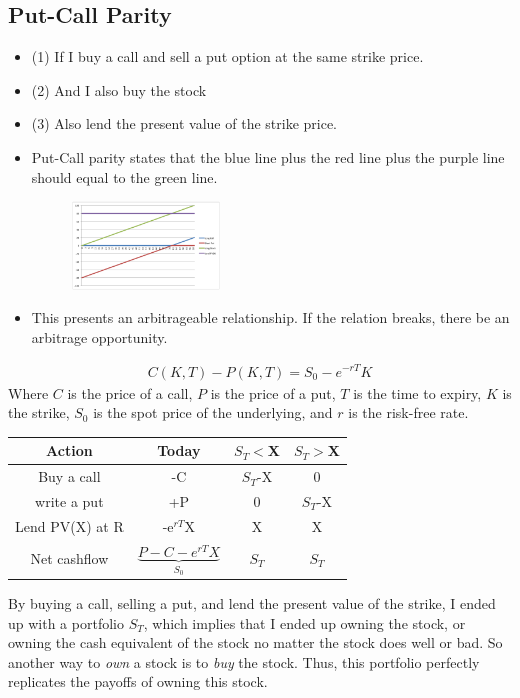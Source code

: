 \begin{multicols}{2}
\subsection{Put-Call Parity}
\begin{itemize}
    \item (1) If I buy a call and sell a put option at the same strike price. 
    \item (2) And I also buy the stock 
    \item (3) Also lend the present value of the strike price. 
    \item Put-Call parity states that the blue line plus the red line plus the purple line should equal to the green line. 
    \begin{figure}[H]
        \centering 
        \includegraphics[width =0.37\textwidth]{Figure/parity.png}
    \end{figure}
    \item This presents an arbitrageable relationship. If the relation breaks, there be an arbitrage opportunity. 
\end{itemize}
\begin{gather*}
    \boxed{C(K,T)-P(K,T) = S_0-e^{-rT}K}
\end{gather*}
Where $C$ is the price of a call, $P$ is the price of a put, $T$ is the time to expiry, $K$ is the strike, $S_0$ is the spot price of the underlying, and $r$ is the risk-free rate. 
\begin{table}[H]
    \begin{tabular}{c|c|c|c}
    Action & Today & $S_T<$X & $S_T>$X \\ \hline
    Buy a call & -C & $S_T$-X & 0 \\ 
    write a put & +P & 0 & $S_T$-X \\ 
    Lend PV(X) at R & -e$^{rT}$X & X & X \\
    Net cashflow & $\underbrace{P-C-e^{rT}X}_{S_0}$ & $S_T$ & $S_T$ \\
    \end{tabular}
\end{table}
By buying a call, selling a put, and lend the present value of the strike, I ended up with a portfolio $S_T$, which implies that I ended up owning the stock, or owning the cash equivalent of the stock no matter the stock does well or bad. So another way to \textit{own} a stock is to \textit{buy} the stock. Thus, this portfolio perfectly replicates the payoffs of owning this stock.


\end{multicols}
